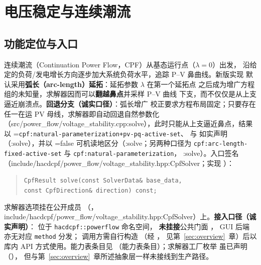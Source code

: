 \section{电压稳定与连续潮流}\label{sec:cpf}

\subsection{功能定位与入口}


连续潮流（Continuation Power Flow，CPF）从基态运行点（$\lambda=0$）出发，
沿给定的负荷/发电增长方向逐步加大系统负荷水平，追踪 P--V 鼻曲线。新版实现
默认采用\textbf{弧长（arc-length）延拓}：延拓参数 $\lambda$ 在第一个延拓点
之后成为增广方程组的未知量，求解器因而可以\textbf{翻越鼻点}并采样 P--V 曲线
下支，而不仅仅是从上支逼近崩溃点。\textbf{回退分支（诚实口径）}：弧长增广
校正要求方程布局固定；只要存在任一在运 PV 母线，求解器即自动回退自然参数化
（src/power\_flow/voltage\_stability.cpp:solve），此时只能从上支逼近鼻点，结果以
=\texttt{cpf:natural-parameterization+pv-pq-active-set}、
 与  如实声明（:solve），并以
=false 可机读地区分（:solve；另两种口径为
\texttt{cpf:arc-length-fixed-active-set} 与 \texttt{cpf:natural-parameterization}，
:solve）。入口签名
（include/hacdcpf/power\_flow/voltage\_stability.hpp:CpfSolver；实现
）：
\begin{quote}\footnotesize
\texttt{CpfResult solve(const SolverData\& base\_data,\\
\hspace*{2em}const CpfDirection\& direction) const;}
\end{quote}
求解器选项挂在公开成员 （，
include/hacdcpf/power\_flow/voltage\_stability.hpp:CpfSolver）上。\textbf{接入口径（诚实声明）}：
 位于 \texttt{hacdcpf::powerflow} 命名空间，
\textbf{未挂接}公共门面 ，
GUI 后端  亦无对应 \texttt{method} 分发；
调用方需自行构造 （经 ，
见第~\ref{sec:overview}~章）后以库内 API 方式使用。能力表条目见
（能力表条目）；求解器工厂枚举 
虽已声明（），
但与第~\ref{sec:overview}~章所述抽象层一样未接线到生产路径。

